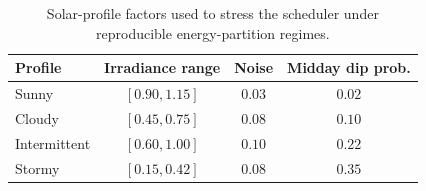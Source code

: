 \begin{table}[t]
\centering
\caption{Solar-profile factors used to stress the scheduler under reproducible energy-partition regimes.}
\label{tab:solar_profiles}
\begin{tabular}{lccc}
\toprule
\textbf{Profile} & \textbf{Irradiance range} & \textbf{Noise} & \textbf{Midday dip prob.} \\
\midrule
Sunny & $[0.90,1.15]$ & $0.03$ & $0.02$ \\
Cloudy & $[0.45,0.75]$ & $0.08$ & $0.10$ \\
Intermittent & $[0.60,1.00]$ & $0.10$ & $0.22$ \\
Stormy & $[0.15,0.42]$ & $0.08$ & $0.35$ \\
\bottomrule
\end{tabular}
\end{table}